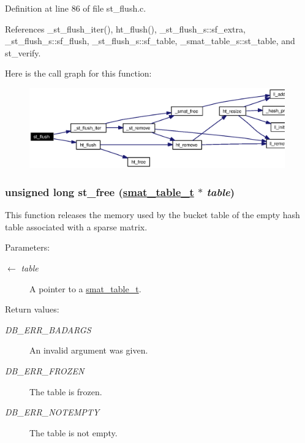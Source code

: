 Definition at line 86 of file st\_\-flush.c.

References \_\-st\_\-flush\_\-iter(), ht\_\-flush(), \_\-st\_\-flush\_\-s::sf\_\-extra, \_\-st\_\-flush\_\-s::sf\_\-flush, \_\-st\_\-flush\_\-s::sf\_\-table, \_\-smat\_\-table\_\-s::st\_\-table, and st\_\-verify.

Here is the call graph for this function:\begin{figure}[H]
\begin{center}
\leavevmode
\includegraphics[width=313pt]{group__dbprim__smat_ga15_cgraph}
\end{center}
\end{figure}
\hypertarget{group__dbprim__smat_ga17}{
\subsubsection[st\_\-free]{\setlength{\rightskip}{0pt plus 5cm}unsigned long st\_\-free (\hyperlink{struct__smat__table__s}{smat\_\-table\_\-t} $\ast$ {\em table})}}
\label{group__dbprim__smat_ga17}


This function releases the memory used by the bucket table of the empty hash table associated with a sparse matrix.

\begin{Desc}
\item[Parameters:]
\begin{description}
\item[\mbox{$\leftarrow$} {\em table}]A pointer to a \hyperlink{group__dbprim__smat_ga0}{smat\_\-table\_\-t}.\end{description}
\end{Desc}
\begin{Desc}
\item[Return values:]
\begin{description}
\item[{\em DB\_\-ERR\_\-BADARGS}]An invalid argument was given. \item[{\em DB\_\-ERR\_\-FROZEN}]The table is frozen. \item[{\em DB\_\-ERR\_\-NOTEMPTY}]The table is not empty.\end{description}
\end{Desc}



